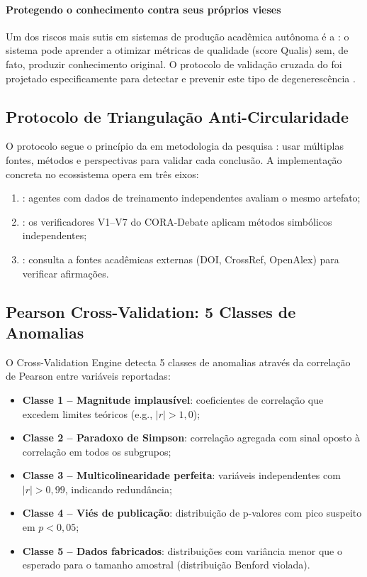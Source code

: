 \paragraph{Protegendo o conhecimento contra seus próprios vieses} Um dos riscos mais sutis em sistemas de produção acadêmica autônoma
é a : o sistema pode aprender a otimizar
métricas de qualidade (score Qualis) sem, de fato, produzir
conhecimento original. O protocolo de validação cruzada do
\opencodeeco{} foi projetado especificamente para detectar e prevenir
este tipo de degenerescência \cite{fanelli2009bias, simonsohn2014pcurve}.

\subsection{Protocolo de Triangulação Anti-Circularidade}

O protocolo segue o princípio da  em
metodologia da pesquisa \cite{denzin2017triangulation}: usar
múltiplas fontes, métodos e perspectivas para validar cada
conclusão. A implementação concreta no ecossistema opera em três
eixos:

\begin{enumerate}
\item {}: agentes com dados de
treinamento independentes avaliam o mesmo artefato;
\item {}: os verificadores V1--V7 do
CORA-Debate aplicam métodos simbólicos independentes;
\item {}: consulta a fontes acadêmicas
externas (DOI, CrossRef, OpenAlex) para verificar afirmações.
\end{enumerate}

\subsection{Pearson Cross-Validation: 5 Classes de Anomalias}

O Cross-Validation Engine detecta 5 classes de anomalias através da
correlação de Pearson entre variáveis reportadas:

\begin{itemize}
\item \textbf{Classe 1 -- Magnitude implausível}: coeficientes de
correlação que excedem limites teóricos (e.g., $|r| > 1,0$);
\item \textbf{Classe 2 -- Paradoxo de Simpson}: correlação agregada
com sinal oposto à correlação em todos os subgrupos;
\item \textbf{Classe 3 -- Multicolinearidade perfeita}: variáveis
independentes com $|r| > 0,99$, indicando redundância;
\item \textbf{Classe 4 -- Viés de publicação}: distribuição de
p-valores com pico suspeito em $p < 0,05$;
\item \textbf{Classe 5 -- Dados fabricados}: distribuições com
variância menor que o esperado para o tamanho amostral
(distribuição Benford violada).
\end{itemize}

